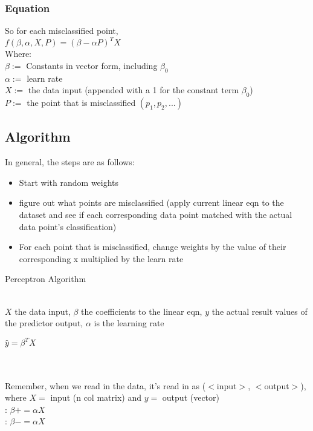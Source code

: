 \documentclass{article}
\begin{document}
\subsubsection{Equation}
So for each misclassified point,\\
$f(\beta, \alpha, X, P) = (\beta - \alpha P)^TX$\\
Where:\\
$\beta :=$ Constants in vector form, including $\beta_0$\\
$\alpha :=$ learn rate\\
$X :=$ the data input (appended with a 1 for the constant term $\beta_0$)\\
$P :=$ the point that is misclassified $(p_1, p_2, ...)$\\

\subsection{Algorithm}
In general, the steps are as follows:

\begin{itemize}
	\item Start with random weights
	\item figure out what points are misclassified (apply current linear eqn to the dataset and see if each corresponding data point matched with the actual data point's classification)
	\item For each point that is misclassified, change weights by the value of their corresponding x multiplied by the learn rate
\end{itemize}

\begin{algorithm}
	\caption{Perceptron Algorithm}
	\begin{algorithmic}
		\\
		\Comment $X$ the data input, $\beta$ the coefficients to the linear eqn, $y$ the actual result values of the predictor output, $\alpha$ is the learning rate
		
		\State $\hat{y} = \beta^TX$
		
		\\\\
		\Comment Remember, when we read in the data, it's read in as ($<$input$>$, $<$output$>$), where $X = $ input (n col matrix) and $y = $ output (vector)\\
		
		:
			\State $\beta += \alpha X$
		\EndIf\\
		
		:
			\State $\beta -= \alpha X$
		\EndIf\\
		
		\EndFor
		
		
		\EndProcedure
	\end{algorithmic}
\end{algorithm}
\end{document}
